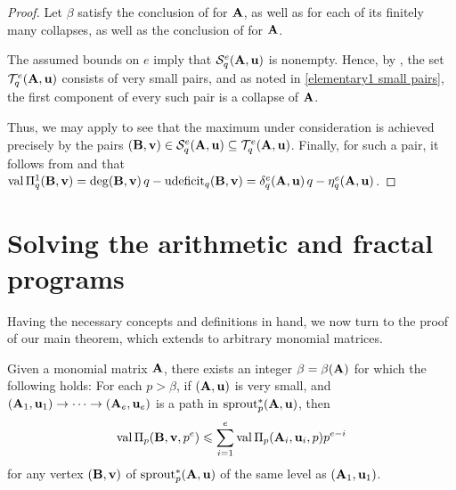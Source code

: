 \documentclass{article}
\newcommand{\AIP}{\Pi}
\begin{document}
\begin{proof}
   Let $\beta$ satisfy the conclusion of  for $\mathbf{A}$, as well as for each of its finitely many collapses, as well as the conclusion of   for $\mathbf{A}$.

The assumed bounds on $e$ imply that $\mathcal{S}_{q}^e(\mathbf{A}, \mathbf{u})$ is nonempty. Hence, by , the set  $\mathcal{T}_{q}^e(\mathbf{A}, \mathbf{u})$ consists of very small pairs, and as noted in \ref{elementary1 small pairs}, the first component of every such pair is a collapse of $\mathbf{A}$. 
   
Thus, we may apply  to see that the maximum under consideration is achieved precisely by the pairs $(\mathbf{B}, \mathbf{v}) \in \mathcal{S}_q^e(\mathbf{A}, \mathbf{u}) \subseteq \mathcal{T}_q^e(\mathbf{A}, \mathbf{u})$.  Finally, for such a pair, it follows from  and  that 
$\val \AIP_\q^1(\matB,\vv{v}) = \degree(\matB,\vv{v})\, \q-\udeficit_q(\matB,\vv{v}) =   \delta_{\q}^e(\matA,\vv{u}) \, \q -\eta_{\q}^e(\matA,\vv{u})$. 
\end{proof}


\newpage
\section{Solving the arithmetic and fractal programs}


Having the necessary concepts and definitions in hand, we now turn to the proof of our main theorem, which extends  to arbitrary monomial matrices.

\begin{lemma}\label{lem: upper bound for higher mu}
   Given a monomial matrix $\mathbf{A}$, there exists an integer $\beta= \beta(\mathbf{A})$ for which the following holds\textup:
   For each $p>\beta$, if $(\mathbf{A}, \mathbf{u})$ is very small, and $(\mathbf{A}_1, \mathbf{u}_1) \to \cdots \to (\mathbf{A}_e, \mathbf{u}_e)$ is a path in $\operatorname{sprout}^{\ast}_p(\mathbf{A},\mathbf{u})$,  then
   \[
      \operatorname{val} \Pi_p(\mathbf{B}, \mathbf{v}, p^e) \leqslant \sum_{i=1}^e \operatorname{val} \Pi_p(\mathbf{A}_i, \mathbf{u}_i, p)p^{e-i}
   \]
   for any vertex $(\mathbf{B}, \mathbf{v})$ of $\operatorname{sprout}^{\ast}_p(\mathbf{A},\mathbf{u})$ of the same level as $(\mathbf{A}_1, \mathbf{u}_1)$.
\end{lemma}
\end{document}
